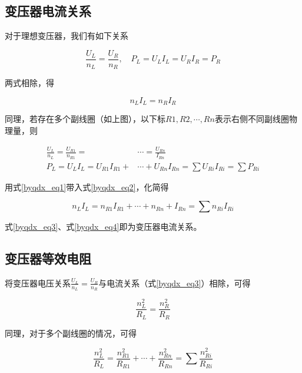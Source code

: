 \subsection{变压器电流关系}

对于理想变压器，我们有如下关系

$$\frac{U_L}{n_L} = \frac{U_R}{n_R}, \quad P_L = U_L I_L = U_R I_R = P_R$$

两式相除，得

\begin{equation}
\label{byqdx_eq3}
\boxed{n_L I_L = n_R I_R}
\end{equation}



同理，若存在多个副线圈（如上图），以下标$R1,R2,\cdots,Rn$表示右侧不同副线圈物理量，则

\begin{subequations}
\begin{align}
\label{byqdx_eq1}
\frac{U_L}{n_L} = \frac{U_{R1}}{n_{R1}} = & \cdots = \frac{U_{Rn}}{I_{Rn}} \\
\label{byqdx_eq2}
P_L = U_L I_L = U_{R1} I_{R1} + & \cdots + U_{Rn} I_{Rn} = \sum U_{Ri} I_{Ri}= \sum P_{Ri}
\end{align}
\end{subequations}

用式\eqref{byqdx_eq1}带入式\eqref{byqdx_eq2}，化简得

\begin{equation}
\label{byqdx_eq4}
\boxed{n_L I_L = n_{R1} I_{R1} + \cdots + n_{Rn} + I_{Rn} = \sum n_{Ri} I_{Ri}}
\end{equation}

式\eqref{byqdx_eq3}、式\eqref{byqdx_eq4}即为变压器电流关系。

\subsection{变压器等效电阻}

将变压器电压关系$\frac{U_L}{n_L} = \frac{U_R}{n_R}$与电流关系（式\eqref{byqdx_eq3}）相除，可得

\begin{equation}
\label{byqdx_eq5}
\boxed{\frac{n_{L}^2}{R_L}=\frac{n_{R}^2}{R_R}}
\end{equation}

同理，对于多个副线圈的情况，可得

\begin{equation}
\label{byqdx_eq6}
\boxed{\frac{n_{L}^2}{R_L} =\frac{n_{R1}^2}{R_{R1}} + \cdots + \frac{n_{Rn}^2}{R_{Rn}} = \sum \frac{n_{Ri}^2}{R_{Ri}}}
\end{equation}

